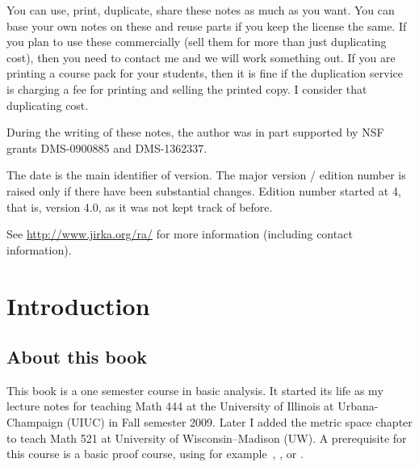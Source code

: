 \documentclass[12pt]{book}
\begin{document}
\bigskip

\noindent
You can use, print, duplicate, share these notes as much as you want.
You can base your own notes on these and reuse parts if you keep the license the
same.
 If you plan to use these commercially (sell them for more than just duplicating cost), then you need to contact me and we will work something out.
If you are printing a course pack for your students, then it is fine if the  duplication service is charging a fee for printing and selling the printed copy.
 I consider that duplicating cost.

\bigskip

\noindent
During the writing of these notes, 
the author was in part supported by NSF grants DMS-0900885 and
DMS-1362337.

\bigskip

\noindent
The date is the main identifier of version.
 The major version / edition number is raised only if there have been substantial changes.
 Edition number started at 4, that is, version 4.0, as it was not kept track of
before.  %

\bigskip

\noindent
See \url{http://www.jirka.org/ra/} for more information
(including contact information).



\tableofcontents
{}

\newpage


\chapter*{Introduction}


\section{About this book}

This book is a one semester course in basic analysis.
It started its life as my lecture notes for teaching Math 444 at the University of Illinois at Urbana-Champaign (UIUC) in Fall semester 2009.
Later I added the metric space chapter to teach Math 521 at University of Wisconsin--Madison (UW).
A prerequisite for this course is a basic proof course, using  for example~\cite{Hammack}, \cite{GIAM}, or \cite{DW}.
\end{document}
